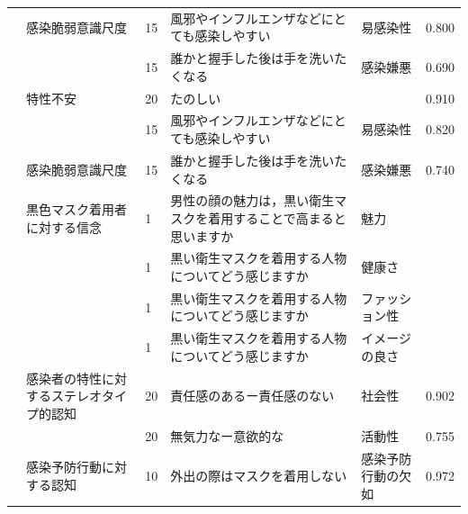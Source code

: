 \begin{landscape}
\begin{longtable}{p{2cm}p{2cm}p{2cm}p{6cm}p{2cm}p{2cm}}
		                         & 感染脆弱意識尺度                         & 15  & 風邪やインフルエンザなどにとても感染しやすい                              & 易感染性                 & 0.800      \\
		                         &                                  & 15  & 誰かと握手した後は手を洗いたくなる                                   & 感染嫌悪                 & 0.690      \\
		                         & 特性不安                             & 20  & たのしい                                                &                      & 0.910      \\
		                         &                                  & 15  & 風邪やインフルエンザなどにとても感染しやすい                              & 易感染性                 & 0.820      \\
		                         & 感染脆弱意識尺度                         & 15  & 誰かと握手した後は手を洗いたくなる                                   & 感染嫌悪                 & 0.740      \\
		\textcite{Kamatani202192}   & 黒色マスク着用者に対する信念                   & 1   & 男性の顔の魅力は，黒い衛生マスクを着用することで高まると思いますか                   & 魅力                   &            \\
		                         &                                  & 1   & 黒い衛生マスクを着用する人物についてどう感じますか                           & 健康さ                  &            \\
		                         &                                  & 1   & 黒い衛生マスクを着用する人物についてどう感じますか                           & ファッション性              &            \\
		                         &                                  & 1   & 黒い衛生マスクを着用する人物についてどう感じますか                           & イメージの良さ              &            \\
		\textcite{Yamamoto202192}   & 感染者の特性に対するステレオタイプ的認知             & 20  & 責任感のあるー責任感のない                                       & 社会性                  & 0.902      \\
		                         &                                  & 20  & 無気力なー意欲的な                                           & 活動性                  & 0.755      \\
		                         & 感染予防行動に対する認知                     & 10  & 外出の際はマスクを着用しない                                      & 感染予防行動の欠如            & 0.972      \\

\end{longtable}
\end{landscape}

